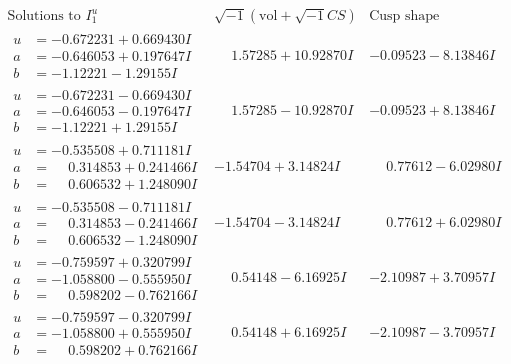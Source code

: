 \documentclass[1p]{elsarticle_modified}
\theoremstyle{definition}
\newcommand{\I}{\sqrt{-1}}
\begin{document}
$$\begin{array}{c|c|c}  
\text{Solutions to }I^u_{1}& \I (\text{vol} + \sqrt{-1}CS) & \text{Cusp shape}\\
 \hline 
\begin{aligned}
u &= -0.672231 + 0.669430 I \\
a &= -0.646053 + 0.197647 I \\
b &= -1.12221 - 1.29155 I\end{aligned}
 & \phantom{-}1.57285 + 10.92870 I & -0.09523 - 8.13846 I \\ \hline\begin{aligned}
u &= -0.672231 - 0.669430 I \\
a &= -0.646053 - 0.197647 I \\
b &= -1.12221 + 1.29155 I\end{aligned}
 & \phantom{-}1.57285 - 10.92870 I & -0.09523 + 8.13846 I \\ \hline\begin{aligned}
u &= -0.535508 + 0.711181 I \\
a &= \phantom{-}0.314853 + 0.241466 I \\
b &= \phantom{-}0.606532 + 1.248090 I\end{aligned}
 & -1.54704 + 3.14824 I & \phantom{-}0.77612 - 6.02980 I \\ \hline\begin{aligned}
u &= -0.535508 - 0.711181 I \\
a &= \phantom{-}0.314853 - 0.241466 I \\
b &= \phantom{-}0.606532 - 1.248090 I\end{aligned}
 & -1.54704 - 3.14824 I & \phantom{-}0.77612 + 6.02980 I \\ \hline\begin{aligned}
u &= -0.759597 + 0.320799 I \\
a &= -1.058800 - 0.555950 I \\
b &= \phantom{-}0.598202 - 0.762166 I\end{aligned}
 & \phantom{-}0.54148 - 6.16925 I & -2.10987 + 3.70957 I \\ \hline\begin{aligned}
u &= -0.759597 - 0.320799 I \\
a &= -1.058800 + 0.555950 I \\
b &= \phantom{-}0.598202 + 0.762166 I\end{aligned}
 & \phantom{-}0.54148 + 6.16925 I & -2.10987 - 3.70957 I \\ \hline\begin{aligned}

\end{aligned}
\end{array}$$
\end{document}
